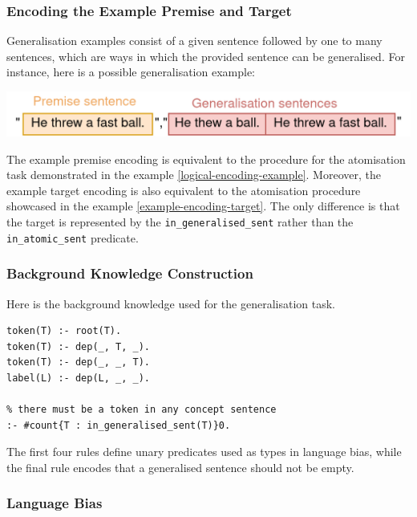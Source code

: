 \subsubsection{Encoding the Example Premise and Target}

Generalisation examples consist of a given sentence followed by one to many sentences, which are ways in which the provided sentence can be generalised.
For instance, here is a possible generalisation example:
\begin{center}
\setlength\parskip{0pt}
\includegraphics[width=.8\linewidth]{solving-nlp-tasks-logically/raw-generalisation-example.png}
\end{center}

The example premise encoding is equivalent to the procedure for the atomisation task demonstrated in the example \ref{logical-encoding-example}.
Moreover, the example target encoding is also equivalent to the atomisation procedure showcased in the example \ref{example-encoding-target}.
The only difference is that the target is represented by the \verb+in_generalised_sent+ rather than the \verb+in_atomic_sent+ predicate.


\subsubsection{Background Knowledge Construction}

Here is the background knowledge used for the generalisation task.
\begin{verbatim}
token(T) :- root(T).
token(T) :- dep(_, T, _).
token(T) :- dep(_, _, T).
label(L) :- dep(L, _, _).

% there must be a token in any concept sentence
:- #count{T : in_generalised_sent(T)}0.
\end{verbatim}
The first four rules define unary predicates used as types in language bias, while the final rule encodes that a generalised sentence should not be empty.

\subsubsection{Language Bias}

